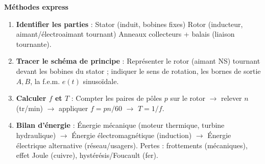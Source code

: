 \documentclass[11pt]{article}
\begin{document}
\begin{bilan}
\textbf{Méthodes express}
\begin{enumerate}
    \item \textbf{Identifier les parties} : Stator (induit, bobines fixes) \textbullet{} Rotor (inducteur, aimant/électroaimant tournant) \textbullet{} Anneaux collecteurs + balais (liaison tournante).
    \item \textbf{Tracer le schéma de principe} : Représenter le rotor (aimant NS) tournant devant les bobines du stator ; indiquer le sens de rotation, les bornes de sortie $A,B$, la f.e.m. $e(t)$ sinusoïdale.
    \item \textbf{Calculer $f$ et $T$} : Compter les paires de pôles $p$ sur le rotor $\to$ relever $n$ (tr/min) $\to$ appliquer $f = p n / 60$ $\to$ $T = 1/f$.
    \item \textbf{Bilan d'énergie} : Énergie mécanique (moteur thermique, turbine hydraulique) $\to$ Énergie électromagnétique (induction) $\to$ Énergie électrique alternative (réseau/usagers). Pertes : frottements (mécaniques), effet Joule (cuivre), hystérésis/Foucault (fer).
\end{enumerate}

\end{bilan}
\end{document}
